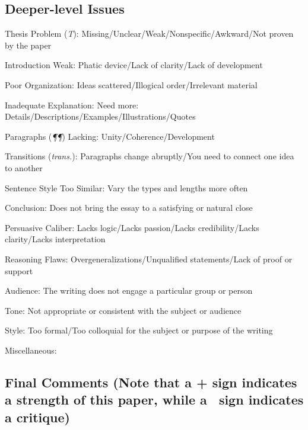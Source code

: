 \documentclass[11pt,twocolumn]{article}
\begin{document}
\subsection*{Deeper-level Issues}

\begin{issues}

\item Thesis Problem (\emph{T}): Missing/Unclear/Weak/Nonspecific/Awkward/Not proven by the paper
\item Introduction Weak: Phatic device/Lack of clarity/Lack of development
\item Poor Organization: Ideas scattered/Illogical order/Irrelevant material
\item Inadequate Explanation: Need more: Details/Descriptions/Examples/Illustrations/Quotes
\item Paragraphs (\emph{\P\P}) Lacking: Unity/Coherence/Development
\item Transitions (\emph{trans.}): Paragraphs change abruptly/You need to connect one idea to another
\item Sentence Style Too Similar: Vary the types and lengths more often
\item Conclusion: Does not bring the essay to a satisfying or natural close
\item Persuasive Caliber: Lacks logic/Lacks passion/Lacks credibility/Lacks clarity/Lacks interpretation
\item Reasoning Flaws: Overgeneralizations/Unqualified statements/Lack of proof or support
\item Audience: The writing does not engage a particular group or person
\item Tone: Not appropriate or consistent with the subject or audience
\item Style: Too formal/Too colloquial for the subject or purpose of the writing
\item Miscellaneous:

\end{issues}

\subsection*{Final Comments (Note that a + sign indicates a strength of this paper, while a \textminus\ sign indicates a critique)}


\end{document}
